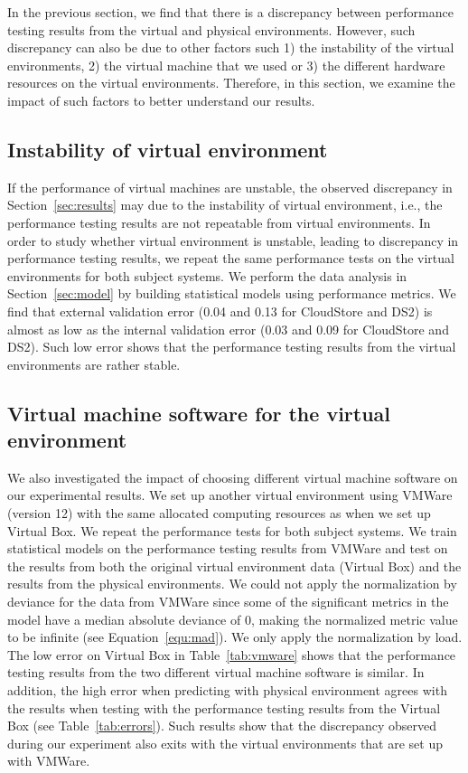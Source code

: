 
In the previous section, we find that there is a discrepancy between performance testing results from the virtual and physical environments. However, such discrepancy can also be due to other factors such 1) the instability of the virtual environments, 2) the virtual machine that we used or 3) the different hardware resources on the virtual environments. Therefore, in this section, we examine the impact of such factors to better understand our results. 


\subsection{Instability of virtual environment}

If the performance of virtual machines are unstable, the observed discrepancy in Section~\ref{sec:results} may due to the instability of virtual environment, i.e., the performance testing results are not repeatable from virtual environments. In order to study whether virtual environment is unstable, leading to discrepancy in performance testing results, we repeat the same performance tests on the virtual environments for both subject systems. We perform the data analysis in Section~\ref{sec:model} by building statistical models using performance metrics. %
We find that external validation error (0.04 and 0.13 for CloudStore and DS2) is almost as low as the internal validation error (0.03 and 0.09 for CloudStore and DS2). Such low error shows that the performance testing results from the virtual environments are rather stable. 

\subsection{Virtual machine software for the virtual environment}

We also investigated the impact of choosing different virtual machine software on our experimental results. We set up another virtual environment using VMWare (version 12) with the same allocated computing resources as when we set up Virtual Box. We repeat the performance tests for both subject systems. We train statistical models on the performance testing results from VMWare and test on the results from both the original virtual environment data (Virtual Box) and the results from the physical environments. We could not apply the normalization by deviance for the data from VMWare since some of the significant metrics in the model have a median absolute deviance of 0, making the normalized metric value to be infinite (see Equation~\ref{equ:mad}). We only apply the normalization by load. The low error on Virtual Box in Table~\ref{tab:vmware} shows that the performance testing results from the two different virtual machine software is similar. In addition, the high error when predicting with physical environment agrees with the results when testing with the performance testing results from the Virtual Box (see Table~\ref{tab:errors}). Such results show that the discrepancy  observed during our experiment also exits with the virtual environments that are set up with VMWare.

